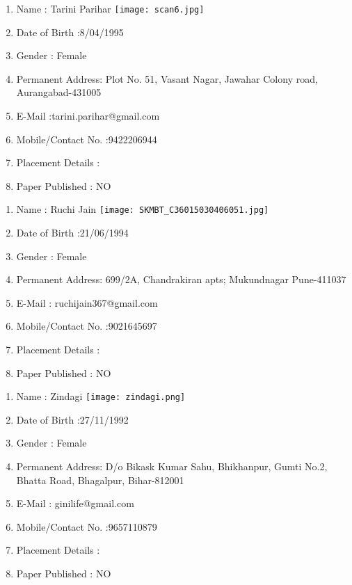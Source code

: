 \documentclass[12pt,a4paper]{report}
\begin{document}
\begin{appendices}
\begin{enumerate}
\end{enumerate}

\newpage
\begin{enumerate}
	\item Name :  Tarini Parihar \hspace{80mm}\texttt{[image: scan6.jpg]}
	\item Date of Birth :8/04/1995
	\item Gender : Female
	\item Permanent Address: Plot No. 51, Vasant Nagar, Jawahar Colony road, Aurangabad-431005 
	\item E-Mail :tarini.parihar@gmail.com
	\item Mobile/Contact No. :9422206944
	\item Placement Details :
	\item Paper Published : NO
	
\end{enumerate}

\newpage
\begin{enumerate}
	\item Name :  Ruchi Jain \hspace{80mm}\texttt{[image: SKMBT\_C36015030406051.jpg]}
	\item Date of Birth :21/06/1994
	\item Gender : Female
	\item Permanent Address: 699/2A, Chandrakiran apts; Mukundnagar Pune-411037
	\item E-Mail : ruchijain367@gmail.com
	\item Mobile/Contact No. :9021645697
	\item Placement Details :
	\item Paper Published : NO
	
\end{enumerate}

\newpage
\begin{enumerate}
	\item Name :  Zindagi \hspace{80mm}\texttt{[image: zindagi.png]}
	\item Date of Birth :27/11/1992
	\item Gender : Female
	\item Permanent Address: D/o Bikask Kumar Sahu, Bhikhanpur, Gumti No.2, Bhatta Road, Bhagalpur, Bihar-812001
	\item E-Mail : ginilife@gmail.com
	\item Mobile/Contact No. :9657110879
	\item Placement Details :
	\item Paper Published : NO
	
\end{enumerate}

\end{appendices}
\end{document}

